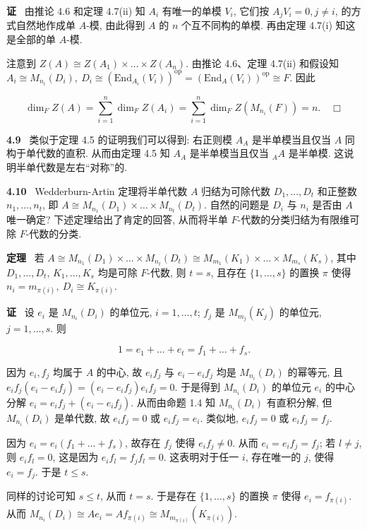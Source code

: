 \documentclass[11pt,a4paper]{article}
\begin{document}
\textbf{证} \ 由推论 4.6 和定理 4.7(ii) 知 $A_i$ 有唯一的单模 $V_i$, 它们按 $A_j V_i = 0, j \neq i$, 的方式自然地作成单 $A$-模, 由此得到 $A$ 的 $n$ 个互不同构的单模. 再由定理 4.7(i) 知这是全部的单 $A$-模.

注意到 $Z(A) \cong Z(A_1) \times \dots \times Z(A_n)$. 由推论 4.6、定理 4.7(ii) 和假设知 $A_i \cong M_{n_i}(D_i), \ D_i \cong (\mathrm{End}_{A_i}(V_i))^{\mathrm{op}} = (\mathrm{End}_A(V_i))^{\mathrm{op}} \cong F$. 因此

$$
\dim_F Z(A) = \sum_{i=1}^n \dim_F Z(A_i) = \sum_{i=1}^n \dim_F Z(M_{n_i}(F)) = n. \quad \Box
$$

\textbf{4.9} \ 类似于定理 4.5 的证明我们可以得到: 右正则模 $A_A$ 是半单模当且仅当 $A$ 同构于单代数的直积. 从而由定理 4.5 知 $A_A$ 是半单模当且仅当 ${}_A A$ 是半单模. 这说明半单代数是左右“对称”的.

\textbf{4.10} \ Wedderburn-Artin 定理将半单代数 $A$ 归结为可除代数 $D_1, \dots, D_t$ 和正整数 $n_1, \dots, n_t$, 即 $A \cong M_{n_1}(D_1) \times \dots \times M_{n_t}(D_t)$. 自然的问题是 $D_i$ 与 $n_i$ 是否由 $A$ 唯一确定? 下述定理给出了肯定的回答, 从而将半单 $F$-代数的分类归结为有限维可除 $F$-代数的分类.

\textbf{定理} \ 若 $A \cong M_{n_1}(D_1) \times \dots \times M_{n_t}(D_t) \cong M_{m_1}(K_1) \times \dots \times M_{m_s}(K_s)$, 其中 $D_1, \dots, D_t$, $K_1, \dots, K_s$ 均是可除 $F$-代数, 则 $t = s$, 且存在 $\{1, \dots, s\}$ 的置换 $\pi$ 使得 $n_i = m_{\pi(i)}, \ D_i \cong K_{\pi(i)}$.

\textbf{证} \ 设 $e_i$ 是 $M_{n_i}(D_i)$ 的单位元, $i = 1, \dots, t$; $f_j$ 是 $M_{m_j}(K_j)$ 的单位元, $j = 1, \dots, s$. 则

$$
1 = e_1 + \dots + e_t = f_1 + \dots + f_s.
$$

因为 $e_i, f_j$ 均属于 $A$ 的中心, 故 $e_i f_j$ 与 $e_i - e_i f_j$ 均是 $M_{n_i}(D_i)$ 的幂等元, 且 $e_i f_j (e_i - e_i f_j) = (e_i - e_i f_j) e_i f_j = 0$. 于是得到 $M_{n_i}(D_i)$ 的单位元 $e_i$ 的中心分解 $e_i = e_i f_j + (e_i - e_i f_j)$. 从而由命题 1.4 知 $M_{n_i}(D_i)$ 有直积分解, 但 $M_{n_i}(D_i)$ 是单代数, 故 $e_i f_j = 0$ 或 $e_i f_j = e_i$. 类似地, $e_i f_j = 0$ 或 $e_i f_j = f_j$.

因为 $e_i = e_i(f_1 + \dots + f_s)$, 故存在 $f_j$ 使得 $e_i f_j \neq 0$. 从而 $e_i = e_i f_j = f_j$; 若 $l \neq j$, 则 $e_i f_l = 0$, 这是因为 $e_i f_l = f_j f_l = 0$. 这表明对于任一 $i$, 存在唯一的 $j$, 使得 $e_i = f_j$. 于是 $t \leq s$.

同样的讨论可知 $s \leq t$, 从而 $t = s$. 于是存在 $\{1, \dots, s\}$ 的置换 $\pi$ 使得 $e_i = f_{\pi(i)}$. 从而 $M_{n_i}(D_i) \cong A e_i = A f_{\pi(i)} \cong M_{m_{\pi(i)}}(K_{\pi(i)})$.
\end{document}
